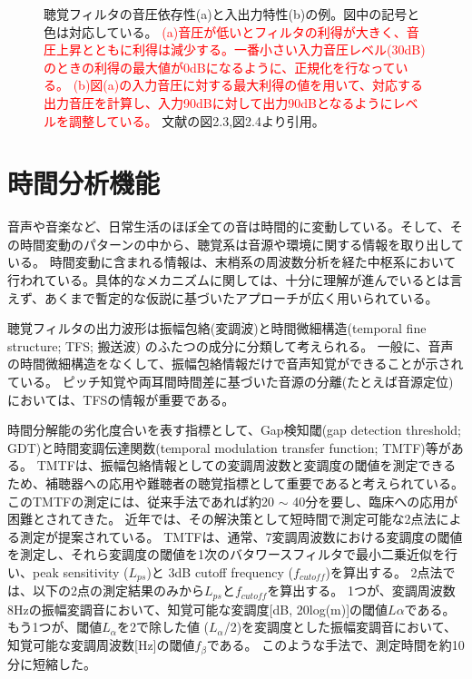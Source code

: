 \begin{figure}[h]
\begin{minipage}[t]{0.5\hsize}
        \label{fig:Basic_IOfunc}
    \end{minipage}
    \label{compression}
    \caption{聴覚フィルタの音圧依存性(a)と入出力特性(b)の例。図中の記号と色は対応している。
            \textcolor{red}{(a)音圧が低いとフィルタの利得が大きく、音圧上昇とともに利得は減少する。一番小さい入力音圧レベル(30dB)のときの利得の最大値が0dBになるように、正規化を行なっている。
            (b)図(a)の入力音圧に対する最大利得の値を用いて、対応する出力音圧を計算し、入力90dBに対して出力90dBとなるようにレベルを調整している。}
              文献\cite{yamamoto2023GESI}の図2.3,図2.4より引用。}
\end{figure}

\newpage




\clearpage
\section{時間分析機能}
音声や音楽など、日常生活のほぼ全ての音は時間的に変動している。そして、その時間変動のパターンの中から、聴覚系は音源や環境に関する情報を取り出している。
時間変動に含まれる情報は、末梢系の周波数分析を経た中枢系において行われている。具体的なメカニズムに関しては、十分に理解が進んでいるとは言えず、あくまで暫定的な仮説に基づいたアプローチが広く用いられている。

聴覚フィルタの出力波形は振幅包絡(変調波)と時間微細構造(temporal fine structure; TFS; 搬送波) のふたつの成分に分類して考えられる。
一般に、音声の時間微細構造をなくして、振幅包絡情報だけで音声知覚ができることが示されている。
ピッチ知覚や両耳間時間差に基づいた音源の分離(たとえば音源定位)においては、TFSの情報が重要である。

時間分解能の劣化度合いを表す指標として、Gap検知閾(gap detection threshold; GDT)と時間変調伝達関数(temporal modulation transfer function; TMTF)等がある。
TMTFは、振幅包絡情報としての変調周波数と変調度の閾値を測定できるため、補聴器への応用や難聴者の聴覚指標として重要であると考えられている。
このTMTFの測定には、従来手法であれば約20 $\sim$ 40分を要し、臨床への応用が困難とされてきた。
近年では、その解決策として短時間で測定可能な2点法による測定が提案されている\cite{morimoto2019Two-PointTMTF}。
TMTFは、通常、7変調周波数における変調度の閾値を測定し、それら変調度の閾値を1次のバタワースフィルタで最小二乗近似を行い、peak sensitivity ($L_{ps}$)と 3dB cutoff frequency ($f_{cutoff}$)を算出する。
2点法では、以下の2点の測定結果のみから$L_{ps}$と$f_{cutoff}$を算出する。
1つが、変調周波数8Hzの振幅変調音において、知覚可能な変調度[dB, 20log(m)]の閾値$L{\alpha}$である。
もう1つが、閾値$L_{\alpha}$を2で除した値 ($L_{\alpha}$/2)を変調度とした振幅変調音において、知覚可能な変調周波数[Hz]の閾値$f_{\beta}$である。
このような手法で、測定時間を約10分に短縮した。

